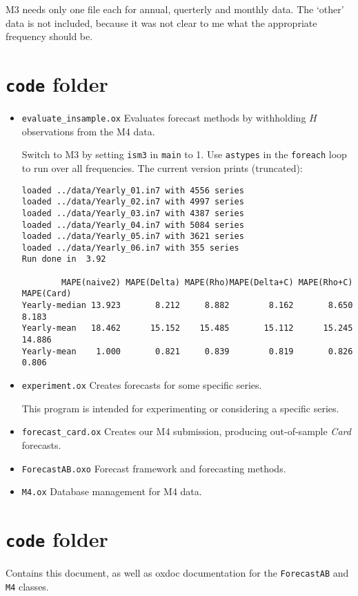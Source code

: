 \documentclass[11pt,a4paper]{article}
\def\baselinestretch{1.2}
\begin{document}
M3 needs only one file each for annual, querterly and monthly data. The `other' data is not included,
because it was not clear to me what the appropriate frequency should be.

\section{\texttt{code} folder}

\begin{itemize}
\item \texttt{evaluate\_insample.ox} Evaluates forecast methods by withholding $H$ observations from the M4 data.

Switch to M3 by setting \texttt{ism3} in \texttt{main} to 1. Use \texttt{astypes} in the \texttt{foreach}
loop to run over all frequencies. The current version prints (truncated):
{\small\begin{verbatim}
loaded ../data/Yearly_01.in7 with 4556 series
loaded ../data/Yearly_02.in7 with 4997 series
loaded ../data/Yearly_03.in7 with 4387 series
loaded ../data/Yearly_04.in7 with 5084 series
loaded ../data/Yearly_05.in7 with 3621 series
loaded ../data/Yearly_06.in7 with 355 series
Run done in  3.92

        MAPE(naive2) MAPE(Delta) MAPE(Rho)MAPE(Delta+C) MAPE(Rho+C) MAPE(Card)
Yearly-median 13.923       8.212     8.882        8.162       8.650      8.183
Yearly-mean   18.462      15.152    15.485       15.112      15.245     14.886
Yearly-mean    1.000       0.821     0.839        0.819       0.826      0.806
\end{verbatim}}


\item \texttt{experiment.ox} Creates forecasts for some specific series.

This program is intended for experimenting or considering a specific series. 

\item \texttt{forecast\_card.ox} Creates our M4 submission, producing out-of-sample \textit{Card} forecasts.

\item \texttt{ForecastAB.oxo} Forecast framework and forecasting methods.
\item \texttt{M4.ox} Database management for M4 data.
\end{itemize}

\section{\texttt{code} folder}

Contains this document, as well as oxdoc documentation for the \texttt{ForecastAB} and \texttt{M4} classes.

\small
\renewcommand{\baselinestretch}{0.9}


\end{document}
